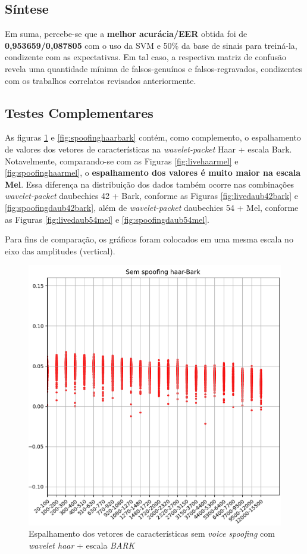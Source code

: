 \subsection{Síntese}
\par Em suma, percebe-se que a \textbf{melhor acurácia/EER} obtida foi de \textbf{0,953659/0,087805} com o uso da SVM e 50\% da base de sinais para treiná-la, condizente com as expectativas. Em tal caso, a respectiva matriz de confusão revela uma quantidade mínima de falsos-genuínos e falsos-regravados, condizentes com os trabalhos correlatos revisados anteriormente.

\subsection{Testes Complementares}
\label{chap:testsResults:sec:Experimento05}
As figuras \ref{fig:livehaarbark} e \ref{fig:spoofinghaarbark} contém, como complemento, o espalhamento de valores dos vetores de características na \textit{wavelet-packet} Haar + escala Bark. Notavelmente, comparando-se com as Figuras \ref{fig:livehaarmel} e \ref{fig:spoofinghaarmel}, o \textbf{espalhamento dos valores é muito maior na escala \textbf{Mel}}. Essa diferença na distribuição dos dados também ocorre nas combinações \textit{wavelet-packet} daubechies 42 + Bark, conforme as Figuras \ref{fig:livedaub42bark} e \ref{fig:spoofingdaub42bark}, além de \textit{wavelet-packet} daubechies 54 + Mel, conforme as Figuras \ref{fig:livedaub54mel} e \ref{fig:spoofingdaub54mel}.

\par Para fins de comparação, os gráficos foram colocados em uma mesma escala no eixo das amplitudes (vertical).
\begin{figure}[!h]
	\centering
	\includegraphics[width=.70\linewidth, height=.68\linewidth]{images/results/barkVersusMel/liveHaarBark}
	\caption{Espalhamento dos vetores de características sem \textit{voice spoofing} com \textit{wavelet haar} + escala \textit{BARK} }
	\label{fig:livehaarbark}
\end{figure}

